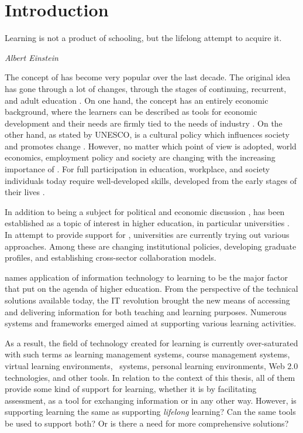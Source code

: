 \chapter{Introduction\label{cha:intro}}
\epigraph{Learning is not a product of schooling, but the lifelong attempt to
acquire it.}{\textit{Albert Einstein}}
\noindent
The concept of \LLLs has become very popular over the last decade. The original
idea has gone through a lot of changes, through the stages of continuing,
recurrent, and adult education \citep{Jarvis2004}. On one hand, the \LLLs
concept has an entirely economic background, where the learners can be described
as tools for economic development and their needs are firmly tied to the needs
of industry \citep[pp.~112-114]{Carter2008}. On the other hand, as stated by
UNESCO, \LLLs is a cultural policy which influences society and promotes change
\citep[pp.~12-14]{Boshier2000}. However, no matter which point of view is
adopted, world economics, employment policy and society are changing with the
increasing importance of \LLLs \citep{Jarvis2008,Simmons-McDonald2009}. For full
participation in education, workplace, and society individuals today require
well-developed \LLLs skills, developed from the early stages of their lives
\citep{Otala1997}.

In addition to being a subject for political and economic discussion
\citep{Bagnall2009}, \LLLs has been established as a topic of interest in
higher education, in particular universities \citep{Knapper2000}. In attempt to
provide support for \LLLsn, universities are currently trying out various
approaches. Among these are changing institutional policies, developing graduate
profiles, and establishing cross-sector collaboration models.

\citet{Duke2001} names application of information technology to learning to be
the major factor that put \LLLs on the agenda of higher education. From the
perspective of the technical solutions available today, the IT revolution
brought the new means of accessing and delivering information for both teaching
and learning purposes. Numerous systems and frameworks emerged aimed at
supporting various learning activities. 

As a result, the field of technology created for learning is currently
over-saturated with such terms as learning management systems, course management
systems, virtual learning environments, \ep~systems, personal learning
environments, Web 2.0 technologies, and other tools. In relation to the context
of this thesis, all of them provide some kind of support for learning, whether
it is by facilitating assessment, as a tool for exchanging information or in any
other way. However, is supporting learning the same as supporting
\textit{lifelong} learning? Can the same tools be used to support both? Or is
there a need for more comprehensive solutions?

